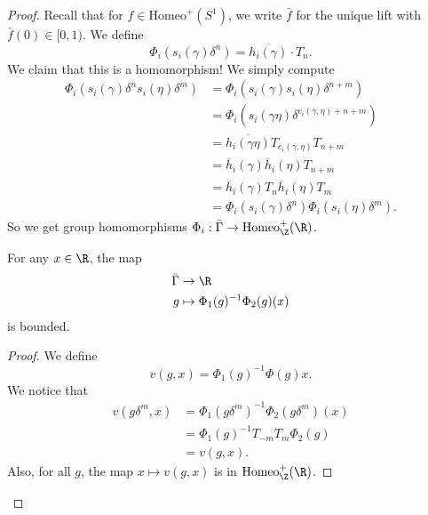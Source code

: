 \documentclass[a4paper]{article}
\newcommand\Homeo{\mathrm{Homeo}}
\begin{document}
\begin{proof}
  Recall that for $f \in \Homeo^+(S^1)$, we write $\bar{f}$ for the unique lift with $\bar{f}(0) \in [0, 1)$. We define
  \[
    \Phi_i (s_i(\gamma) \delta^n) = \overline{h_i(\gamma)} \cdot T_n.
  \]
  We claim that this is a homomorphism! We simply compute
  \begin{align*}
    \Phi_i (s_i(\gamma) \delta^n s_i(\eta) \delta^m) &= \Phi_i(s_i(\gamma) s_i(\eta) \delta^{n + m})\\
    &= \Phi_i(s_i(\gamma \eta) \delta^{c_i(\gamma, \eta) + n + m})\\
    &= \overline{h_i(\gamma \eta)} T_{c_i(\gamma, \eta)} T_{n + m}\\
    &= \overline{h}_i(\gamma) \overline{h}_i(\eta) T_{n + m}\\
    &= \overline{h}_i(\gamma) T_n \overline{h}_i(\eta) T_m\\
    &= \Phi_i(s_i(\gamma) \delta^n) \Phi_i(s_i(\eta) \delta^m).
  \end{align*}
  So we get group homomorphisms $\Phi_i: \bar{\Gamma} \to \Homeo^+_\Z(\R)$.

  \begin{claim}
    For any $x \in \R$, the map
    \begin{align*}
      \bar{\Gamma} &\to \R\\
      g &\mapsto \Phi_1(g)^{-1} \Phi_2(g) (x)
    \end{align*}
    is bounded.
  \end{claim}

  \begin{proof}
    We define
    \[
      v(g, x) = \Phi_1(g)^{-1} \Phi(g)x.
    \]
    We notice that
    \begin{align*}
      v(g \delta^m, x) &= \Phi_1(g \delta^m)^{-1} \Phi_2(g \delta^m)(x)\\
      &= \Phi_1(g)^{-1} T_{-m} T_m \Phi_2(g)\\
      &= v(g, x).
    \end{align*}
    Also, for all $g$, the map $x \mapsto v(g, x)$ is in $\Homeo^+_\Z(\R)$.


\end{proof}
\end{proof}
\end{document}

